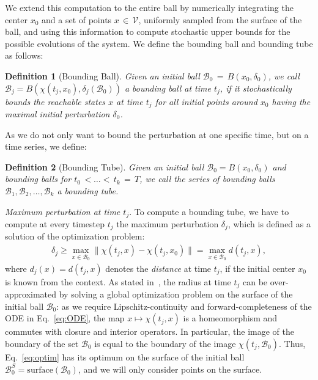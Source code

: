 \documentclass[letterpaper]{article} %
\newcommand{\rd}{\delta}
\newtheorem{definition}{Definition}
\newcommand{\calB}{\mathcal{B}}
\newcommand{\calV}{\mathcal{V}}
\begin{document}
We extend this computation to the entire ball by numerically integrating the center $x_0$ and a set of points $x\,{\in}\,\calV$, uniformly sampled from the surface of the ball, and using this information to compute stochastic upper bounds for the possible evolutions of the system.
We define the bounding ball and bounding tube as follows:
%
\begin{definition}[Bounding Ball]
     Given an initial ball $\calB_0\,{=}\,B(x_0, \rd_0)$, we call $\calB_j = B(\chi(t_j, x_0), \rd_{j}(\calB_0))$ a {\em bounding ball} at time $t_j$, if it stochastically bounds the reachable states $x$ at time $t_j$ for all initial points around $x_0$ having the maximal initial perturbation $\rd_0$.
\end{definition}
%
As we do not only want to bound the perturbation at one specific time, but on a time series, we define:
%
\begin{definition}[Bounding Tube]
     Given an initial ball $\calB_0 = B(x_0, \rd_0)$ and bounding balls for $t_0\,{<}\dots{<}\,t_k\,{=}\,T$, we call the series of bounding balls $\calB_1, \calB_2, \dots, \calB_k$ a \emph{bounding tube}.
\end{definition}
%
\emph{Maximum perturbation at time $t_j$}. To compute a bounding tube, we have to compute at every timestep $t_j$ the maximum perturbation $\rd_j$, which is defined as a solution of the optimization problem:
\begin{align}\label{eq:optim}
    \rd_j \ge \max_{x\in\calB_0}\|\chi(t_j, x) - \chi(t_j, x_0)\| = \max_{x\in\calB_0} d(t_j, x),
\end{align}
where $d_j(x)=d(t_j,x)$ denotes the {\em distance} at time $t_j$, if the initial center $x_0$ is known from the context. As stated in~\cite{Gruenbacher2021verification}, the radius at time $t_j$ can be over-approximated by solving a global optimization problem on the surface of the initial ball $\calB_0$: as we require Lipschitz-continuity and forward-completeness of the ODE in Eq.~\eqref{eq:ODE}, the map $x \mapsto \chi(t_j,x)$ is a homeomorphism and commutes with closure and interior operators. In particular, the image of the boundary of the set $\calB_0$ is equal to the boundary of the image $\chi(t_j,\calB_0)$. Thus, Eq.~\eqref{eq:optim} has its optimum on the surface of the initial ball $\calB_0^S = \textrm{surface}(\calB_0)$, and we will only consider points on the surface.
\end{document}
